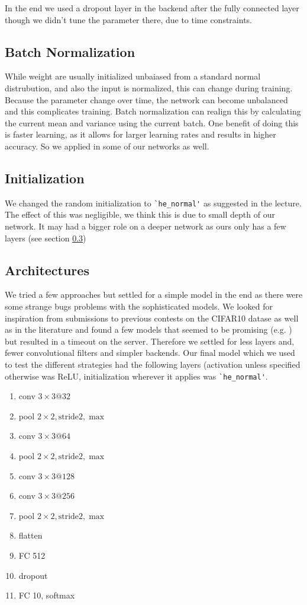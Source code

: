 In the end we used a dropout layer in the backend after the fully connected layer though we didn't tune the parameter there, due to time constraints. 
\subsection{Batch Normalization}
While weight are usually initialized unbaiased from a standard normal distrubution, and also the input is normalized, this can change during training. Because the parameter change over time, the network can become unbalanced and this complicates training.
Batch normalization can realign this by calculating the current mean and variance using the current batch. One benefit of doing this is faster learning, as it allows for larger learning rates and results in higher accuracy. So we applied in some of our networks as well.
\subsection{Initialization}
We changed the random initialization to \lstinline{`he_normal'} \cite{he} as suggested in the lecture. The effect of this was negligible, we think this is due to small depth of our network. It may had a bigger role on a deeper network as ours only has a few layers (see section \ref{sec:a})
\subsection{Architectures}\label{sec:a}
We tried a few approaches but settled for a simple model in the end as there were some strange bugs problems with the sophisticated models. We looked for inspiration from submissions to previous contests on the CIFAR10 datase as well as in the literature and found a few models that seemed to be promising  (e.g. \cite{ref})  but resulted in a timeout on the server. Therefore we settled for less layers and, fewer convolutional filters and simpler backends. 
Our final model which we used to test the different strategies had the following layers (activation unless specified otherwise was ReLU, initialization wherever it applies was \lstinline{`he_normal'}.
\begin{enumerate}
\item conv $3\times 3@32$
\item pool $2\times 2, \text{stride} 2, \max$
\item conv $3\times 3@64$
\item pool $2\times 2, \text{stride} 2, \max$
\item conv $3\times 3@128$
\item conv $3\times 3@256$
\item pool $2\times 2, \text{stride} 2, \max$
\item flatten
\item FC 512
\item dropout
\item FC 10, softmax
\end{enumerate}

